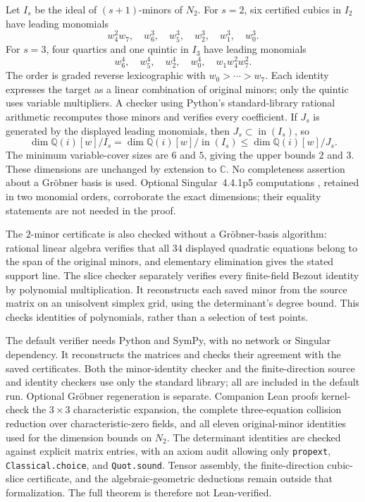 \documentclass[11pt]{amsart}
\theoremstyle{remark}
\newcommand{\C}{\mathbb C}
\newcommand{\Q}{\mathbb Q}
\begin{document}
Let $I_s$ be the ideal of $(s+1)$-minors of $N_2$. For $s=2$, six certified cubics in $I_2$ have leading monomials
\[
 w_4^2w_7,\quad w_6^3,\quad w_5^3,\quad w_2^3,\quad w_1^3,\quad w_0^3.
\]
For $s=3$, four quartics and one quintic in $I_3$ have leading monomials
\[
 w_6^4,\quad w_5^4,\quad w_2^4,\quad w_0^4,\quad w_1w_4^2w_7^2.
\]
The order is graded reverse lexicographic with $w_0>\cdots>w_7$. Each identity expresses the target as a linear combination of original minors; only the quintic uses variable multipliers. A checker using Python's standard-library rational arithmetic recomputes those minors and verifies every coefficient. If $J_s$ is generated by the displayed leading monomials, then $J_s\subset\operatorname{in}(I_s)$, so
\[
 \dim\Q(i)[w]/I_s=\dim\Q(i)[w]/\operatorname{in}(I_s)
 \leq\dim\Q(i)[w]/J_s.
\]
The minimum variable-cover sizes are $6$ and $5$, giving the upper bounds $2$ and $3$. These dimensions are unchanged by extension to $\C$. No completeness assertion about a Gr\"obner basis is used. Optional Singular~4.4.1p5 computations \cite{singular}, retained in two monomial orders, corroborate the exact dimensions; their equality statements are not needed in the proof.

The $2$-minor certificate is also checked without a Gr\"obner-basis algorithm: rational linear algebra verifies that all $34$ displayed quadratic equations belong to the span of the original minors, and elementary elimination gives the stated support line. The slice checker separately verifies every finite-field Bezout identity by polynomial multiplication. It reconstructs each saved minor from the source matrix on an unisolvent simplex grid, using the determinant's degree bound. This checks identities of polynomials, rather than a selection of test points.

The default verifier needs Python and SymPy, with no network or Singular dependency. It reconstructs the matrices and checks their agreement with the saved certificates. Both the minor-identity checker and the finite-direction source and identity checkers use only the standard library; all are included in the default run. Optional Gr\"obner regeneration is separate. Companion Lean proofs kernel-check the $3\times3$ characteristic expansion, the complete three-equation collision reduction over characteristic-zero fields, and all eleven original-minor identities used for the dimension bounds on $N_2$. The determinant identities are checked against explicit matrix entries, with an axiom audit allowing only \texttt{propext}, \texttt{Classical.choice}, and \texttt{Quot.sound}. Tensor assembly, the finite-direction cubic-slice certificate, and the algebraic-geometric deductions remain outside that formalization. The full theorem is therefore not Lean-verified.
\end{document}
